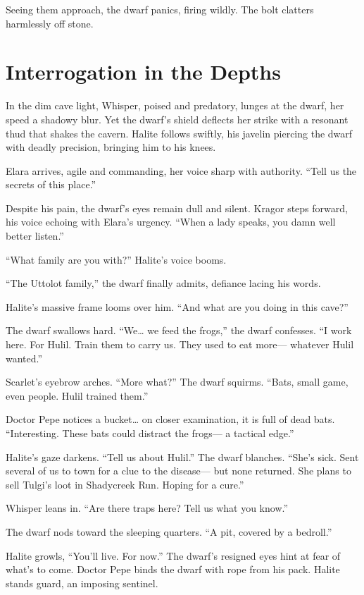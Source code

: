 \documentclass[
  letterpaper,12pt,twoside,twocolumn,openany,
  nodeprecatedcode,bg=full]{dndbook}
\begin{document}
Seeing them approach, the dwarf panics, firing wildly. The bolt clatters
harmlessly off stone.

\section{Interrogation in the Depths}\label{interrogation-in-the-depths}

In the dim cave light, Whisper, poised and predatory, lunges at the
dwarf, her speed a shadowy blur. Yet the dwarf's shield deflects her
strike with a resonant thud that shakes the cavern. Halite follows
swiftly, his javelin piercing the dwarf with deadly precision, bringing
him to his knees.

Elara arrives, agile and commanding, her voice sharp with authority.
``Tell us the secrets of this place.''

Despite his pain, the dwarf's eyes remain dull and silent. Kragor steps
forward, his voice echoing with Elara's urgency. ``When a lady speaks,
you damn well better listen.''

``What family are you with?'' Halite's voice booms.

``The Uttolot family,'' the dwarf finally admits, defiance lacing his
words.

Halite's massive frame looms over him. ``And what are you doing in this
cave?''

The dwarf swallows hard. ``We\ldots{} we feed the frogs,'' the dwarf
confesses. ``I work here. For Hulil. Train them to carry us. They used
to eat more--- whatever Hulil wanted.''

Scarlet's eyebrow arches. ``More what?'' The dwarf squirms. ``Bats,
small game, even people. Hulil trained them.''

Doctor Pepe notices a bucket\ldots{} on closer examination, it is full
of dead bats. ``Interesting. These bats could distract the frogs--- a
tactical edge.''

Halite's gaze darkens. ``Tell us about Hulil.'' The dwarf blanches.
``She's sick. Sent several of us to town for a clue to the disease---
but none returned. She plans to sell Tulgi's loot in Shadycreek Run.
Hoping for a cure.''

Whisper leans in. ``Are there traps here? Tell us what you know.''

The dwarf nods toward the sleeping quarters. ``A pit, covered by a
bedroll.''

Halite growls, ``You'll live. For now.'' The dwarf's resigned eyes hint
at fear of what's to come. Doctor Pepe binds the dwarf with rope from
his pack. Halite stands guard, an imposing sentinel.
\end{document}
